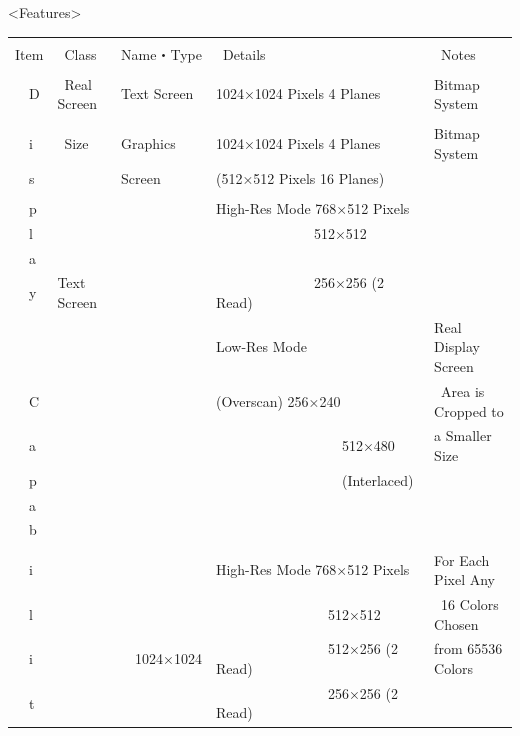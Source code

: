 \documentclass[twoside,a4paper,12pt]{article}
\begin{document}
\newpage

<Features>

\setlength{\tabcolsep}{0.5mm}
\begin{tabular}{|p{13mm}|p{23mm}|p{4mm}|p{20mm}|p{65mm}|p{36mm}|}
\hline
& & \multicolumn{2}{l|}{} & &\\[-2mm]
Item & \ Class & \multicolumn{2}{l|}{Name・Type} & \ Details & \ Notes\\[1mm]
\hline
& & \multicolumn{2}{l|}{} & &\\[-1mm]
\ \ D & \ Real Screen & \multicolumn{2}{l|}{Text Screen} & 1024×1024 Pixels 4 Planes & Bitmap System\\
\cline{3-6}
& & \multicolumn{2}{l|}{} & &\\[-4mm]
\ \ i & \ Size & \multicolumn{2}{l|}{Graphics} & 1024×1024 Pixels 4 Planes & Bitmap System\\
\ \ s & & \multicolumn{2}{l|}{Screen} & (512×512 Pixels 16 Planes) &\\
\cline{2-6}
& & \multicolumn{2}{l|}{} & &\\[-4mm]
\ \ p & & \multicolumn{2}{l|}{} & High-Res Mode 768×512 Pixels &\\
\ \ l & & \multicolumn{2}{l|}{} & \ \ \ \ \ \ \ \ \ \ \ \ \ \ 512×512 &\\
\ \ a & & \multicolumn{2}{l|}{} & &\\
\ \ y & Text Screen & \multicolumn{2}{l|}{} & \ \ \ \ \ \ \ \ \ \ \ \ \ \ 256×256 (2 Read) &\\
& & \multicolumn{2}{l|}{} & Low-Res Mode & Real Display Screen\\
\ \ C & & \multicolumn{2}{l|}{} & (Overscan) 256×240 & \ Area is Cropped to\\
\ \ a & & \multicolumn{2}{l|}{} & \ \ \ \ \ \ \ \ \ \ \ \ \ \ \ \ \ \ 512×480 & a Smaller Size\\
\ \ p & & \multicolumn{2}{l|}{} & \ \ \ \ \ \ \ \ \ \ \ \ \ \ \ \ \ \ (Interlaced) &\\
\ \ a & & \multicolumn{2}{l|}{} & &\\
\ \ b & & \multicolumn{2}{l|}{} & &\\
\cline{2-6}
& & & & &\\[-4mm]
\ \ i & & & & High-Res Mode 768×512 Pixels & For Each Pixel Any\\
\ \ l & & & & \ \ \ \ \ \ \ \ \ \ \ \ \ \ \ \ 512×512 & \ 16 Colors Chosen\\
\ \ i & & & 1024×1024 & \ \ \ \ \ \ \ \ \ \ \ \ \ \ \ \ 512×256 (2 Read) & from 65536 Colors\\
\ \ t & & & & \ \ \ \ \ \ \ \ \ \ \ \ \ \ \ \ 256×256 (2 Read) &\\

\end{tabular}
\end{document}
